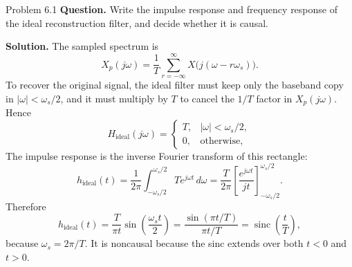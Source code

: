 \documentclass[10pt]{article}
\newcommand{\sinc}{\operatorname{sinc}}
\newcommand{\Prompt}[1]{\textbf{Question.} #1}
\newcommand{\SketchLabel}{\tcblower\textbf{Solution.}}
\begin{document}
\begin{examplebox}{Problem 6.1}
  \Prompt{Write the impulse response and frequency response of the ideal reconstruction filter, and decide whether it is causal.}

  \medskip
  \SketchLabel{}
  The sampled spectrum is
  \[
    X_p(j\omega)=\frac{1}{T}\sum_{r=-\infty}^{\infty}X\!\bigl(j(\omega-r\omega_s)\bigr).
  \]
  To recover the original signal, the ideal filter must keep only the baseband copy in
  \(|\omega|<\omega_s/2\), and it must multiply by \(T\) to cancel the \(1/T\) factor in \(X_p(j\omega)\). Hence
  \[
    H_{\text{ideal}}(j\omega)=
    \begin{cases}
      T,& |\omega|<\omega_s/2,\\
      0,& \text{otherwise},
    \end{cases}
  \]
  The impulse response is the inverse Fourier transform of this rectangle:
  \[
    h_{\text{ideal}}(t)
    =\frac{1}{2\pi}\int_{-\omega_s/2}^{\omega_s/2} T e^{j\omega t}\,d\omega
    =\frac{T}{2\pi}\left[\frac{e^{j\omega t}}{jt}\right]_{-\omega_s/2}^{\omega_s/2}.
  \]
  Therefore
  \[
    h_{\text{ideal}}(t)
    =\frac{T}{\pi t}\sin\!\left(\frac{\omega_s t}{2}\right)
    =\frac{\sin(\pi t/T)}{\pi t/T}
    =\sinc\!\left(\frac{t}{T}\right),
  \]
  because \(\omega_s=2\pi/T\).
  It is noncausal because the sinc extends over both \(t<0\) and \(t>0\).

  \begin{center}
  \end{center}
\end{examplebox}
\end{document}
